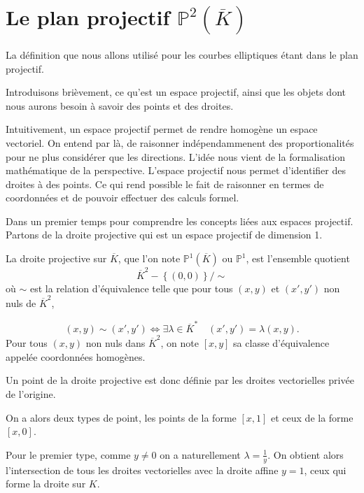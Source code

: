\chapter{Le plan projectif $\mathbb{P}^2(\overline{K})$}

La définition que nous allons utilisé pour les courbes elliptiques étant dans le plan
projectif.

Introduisons brièvement, ce qu'est un espace projectif, ainsi que les objets dont nous aurons
besoin à savoir des points et des droites.

Intuitivement, un espace projectif permet de rendre homogène un espace vectoriel. On entend
par là, de raisonner indépendammenent des proportionalités pour ne plus considérer que les
directions. L'idée nous vient de la formalisation mathématique de la perspective. 
L'espace projectif nous permet d'identifier des droites à des points. Ce qui rend possible
le fait de raisonner en termes de coordonnées et de pouvoir effectuer des calculs formel.

Dans un premier temps pour comprendre les concepts liées aux espaces projectif. Partons de la
droite projective qui est un espace projectif de dimension 1.

\begin{definition}
    La droite projective sur $\overline{K}$, que l'on note $\mathbb{P}^1(\overline{K})$ ou
    $\mathbb{P}^1$, est l'ensemble quotient
    \[
    \overline{K}^2 - \left\{ (0,0) \right\} / \sim
    \] 
    où $\sim$ est la relation d'équivalence telle que pour tous $\left( x,y \right) $ et
    $\left( x',y'\right) $ non nuls de $\overline{K}^2$,

    \[
    \left( x,y \right) \sim \left( x',y' \right) \iff \exists \lambda \in
    \overline{K}^{*} \quad \left( x',y' \right) = \lambda \left( x,y \right) 
    .\] 
    Pour tous $\left( x,y \right) $ non nuls dans $\overline{K}^2$, on note $\left[ x,y
    \right] $ sa classe d'équivalence appelée coordonnées homogènes.
\end{definition}

Un point de la droite projective est donc définie par les droites vectorielles privée de
l'origine.

On a alors deux types de point, les points de la forme $\left[ x,1 \right] $ et ceux de
la forme $\left[ x,0 \right] $.

Pour le premier type, comme $y \neq 0$ on a naturellement $\lambda = \frac{1}{y}$. On
obtient alors l'intersection de tous les droites vectorielles avec la droite affine $y=1$, ceux
qui forme la droite sur $K$.

